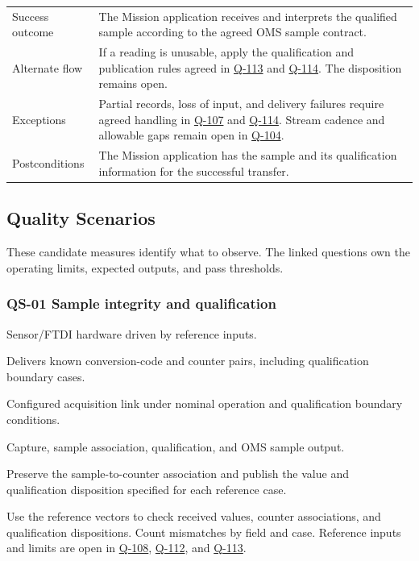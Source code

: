 \begin{tabularx}{\linewidth}{L{2.8cm}Y}
Success outcome & The Mission application receives and interprets the qualified sample according to the agreed OMS sample contract.\\
Alternate flow & If a reading is unusable, apply the qualification and publication rules agreed in \hyperref[Question:Q-113]{Q-113} and \hyperref[Question:Q-114]{Q-114}. The disposition remains open.\\
Exceptions & Partial records, loss of input, and delivery failures require agreed handling in \hyperref[Question:Q-107]{Q-107} and \hyperref[Question:Q-114]{Q-114}. Stream cadence and allowable gaps remain open in \hyperref[Question:Q-104]{Q-104}.\\
Postconditions & The Mission application has the sample and its qualification information for the successful transfer.\\
\end{tabularx}
\normalsize

\subsection{Quality Scenarios}
These candidate measures identify what to observe. The linked questions own
the operating limits, expected outputs, and pass thresholds.

\subsubsection{QS-01 Sample integrity and qualification}
\label{Scenario:QS-01}
\begin{description}[leftmargin=0pt,labelindent=0pt,labelsep=0pt,style=nextline]
\item[Stimulus source] Sensor/FTDI hardware driven by reference inputs.
\item[Stimulus] Delivers known conversion-code and counter pairs, including qualification boundary cases.
\item[Environment] Configured acquisition link under nominal operation and qualification boundary conditions.
\item[Artifact] Capture, sample association, qualification, and OMS sample output.
\item[Response] Preserve the sample-to-counter association and publish the value and qualification disposition specified for each reference case.
\item[Response measure] Use the reference vectors to check received values, counter associations, and qualification dispositions. Count mismatches by field and case. Reference inputs and limits are open in \hyperref[Question:Q-108]{Q-108}, \hyperref[Question:Q-112]{Q-112}, and \hyperref[Question:Q-113]{Q-113}.
\end{description}

